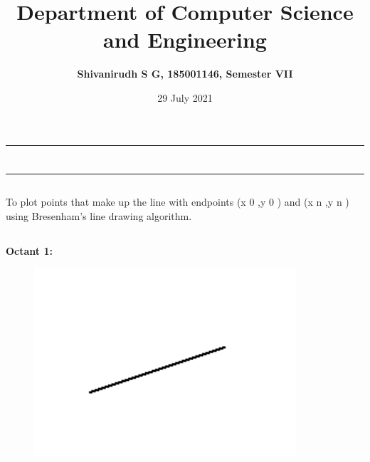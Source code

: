 \documentclass[12pt,letterpaper]{article}
\title{\textbf{Department of Computer Science and Engineering}}
\author{\textbf{Shivanirudh S G, 185001146, Semester VII }}
\date{29 July 2021}
\begin{document}
\maketitle
\hrule
\section*{}
\hrule 
\bigskip\bigskip

\subsection*{}

\subsection*{}
\begin{flushleft}
    To plot points that make up the line with endpoints (x 0 ,y 0 ) and (x n ,y n ) using Bresenham’s line drawing algorithm.  
\end{flushleft}

\subsection*{}
\begin{flushleft}




\end{flushleft}
\newpage
\subsection*{}
\textbf{Octant 1:}
\begin{figure}[h]
    \centering
    \includegraphics[height=7cm]{Outputs/O1.png}
\end{figure}
\end{document}
